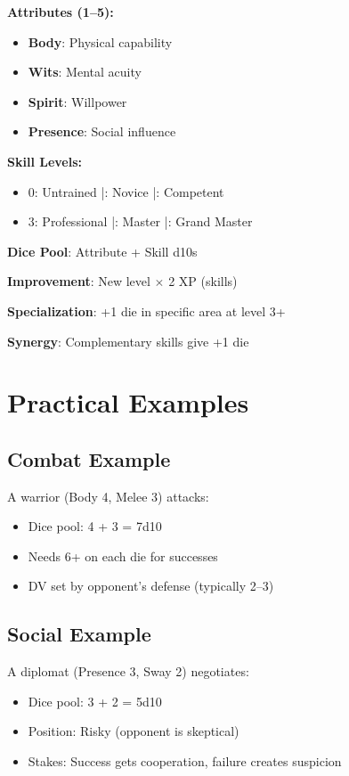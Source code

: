 \begin{tcolorbox}[colback=blue!5!white,colframe=blue!75!black,title=Attributes and Skills Quick Reference,fonttitle=\bfseries]
\textbf{Attributes (1--5):}
\begin{itemize}
\item \textbf{Body}: Physical capability
\item \textbf{Wits}: Mental acuity
\item \textbf{Spirit}: Willpower
\item \textbf{Presence}: Social influence
\end{itemize}

\textbf{Skill Levels:}
\begin{itemize}
\item 0: Untrained \;|: Novice \;|: Competent
\item 3: Professional \;|: Master \;|: Grand Master
\end{itemize}

\textbf{Dice Pool}: Attribute + Skill d10s

\textbf{Improvement}: New level $\times$ 2 XP (skills)

\textbf{Specialization}: +1 die in specific area at level 3+

\textbf{Synergy}: Complementary skills give +1 die
\end{tcolorbox}

\section{Practical Examples}

\subsection*{Combat Example}
A warrior (Body 4, Melee 3) attacks:
\begin{itemize}
\item Dice pool: 4 + 3 = 7d10
\item Needs 6+ on each die for successes
\item DV set by opponent's defense (typically 2--3)
\end{itemize}

\subsection*{Social Example}
A diplomat (Presence 3, Sway 2) negotiates:
\begin{itemize}
\item Dice pool: 3 + 2 = 5d10
\item Position: Risky (opponent is skeptical)
\item Stakes: Success gets cooperation, failure creates suspicion
\end{itemize}

